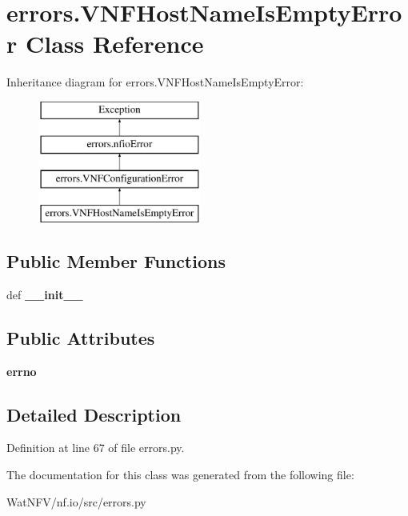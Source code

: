 \hypertarget{classerrors_1_1VNFHostNameIsEmptyError}{\section{errors.\-V\-N\-F\-Host\-Name\-Is\-Empty\-Error Class Reference}
\label{classerrors_1_1VNFHostNameIsEmptyError}
}
Inheritance diagram for errors.\-V\-N\-F\-Host\-Name\-Is\-Empty\-Error\-:\begin{figure}[H]
\begin{center}
\leavevmode
\includegraphics[height=4.000000cm]{classerrors_1_1VNFHostNameIsEmptyError}
\end{center}
\end{figure}
\subsection*{Public Member Functions}
\begin{DoxyCompactItemize}
\item 
\hypertarget{classerrors_1_1VNFHostNameIsEmptyError_a54ff177a72b031db9662672cbc262f86}{def {\bfseries \-\_\-\-\_\-init\-\_\-\-\_\-}}\label{classerrors_1_1VNFHostNameIsEmptyError_a54ff177a72b031db9662672cbc262f86}

\end{DoxyCompactItemize}
\subsection*{Public Attributes}
\begin{DoxyCompactItemize}
\item 
\hypertarget{classerrors_1_1VNFHostNameIsEmptyError_a4a67c7308f0dede292cf6b5654324f39}{{\bfseries errno}}\label{classerrors_1_1VNFHostNameIsEmptyError_a4a67c7308f0dede292cf6b5654324f39}

\end{DoxyCompactItemize}


\subsection{Detailed Description}


Definition at line 67 of file errors.\-py.



The documentation for this class was generated from the following file\-:\begin{DoxyCompactItemize}
\item 
Wat\-N\-F\-V/nf.\-io/src/errors.\-py\end{DoxyCompactItemize}
